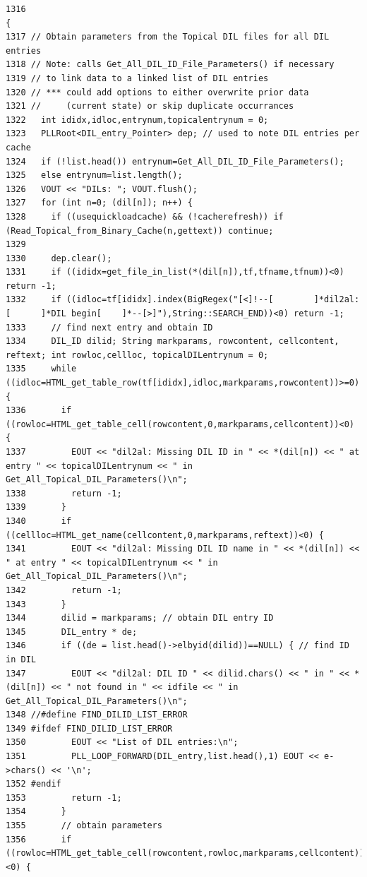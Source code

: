\footnotesize\begin{verbatim}1316                                                                                                        {
1317 // Obtain parameters from the Topical DIL files for all DIL entries
1318 // Note: calls Get_All_DIL_ID_File_Parameters() if necessary
1319 // to link data to a linked list of DIL entries
1320 // *** could add options to either overwrite prior data
1321 //     (current state) or skip duplicate occurrances
1322   int ididx,idloc,entrynum,topicalentrynum = 0;
1323   PLLRoot<DIL_entry_Pointer> dep; // used to note DIL entries per cache
1324   if (!list.head()) entrynum=Get_All_DIL_ID_File_Parameters();
1325   else entrynum=list.length();
1326   VOUT << "DILs: "; VOUT.flush();
1327   for (int n=0; (dil[n]); n++) {
1328     if ((usequickloadcache) && (!cacherefresh)) if (Read_Topical_from_Binary_Cache(n,gettext)) continue;
1329 
1330     dep.clear();
1331     if ((ididx=get_file_in_list(*(dil[n]),tf,tfname,tfnum))<0) return -1;
1332     if ((idloc=tf[ididx].index(BigRegex("[<]!--[        ]*dil2al:[      ]*DIL begin[    ]*--[>]"),String::SEARCH_END))<0) return -1;
1333     // find next entry and obtain ID
1334     DIL_ID dilid; String markparams, rowcontent, cellcontent, reftext; int rowloc,cellloc, topicalDILentrynum = 0;
1335     while ((idloc=HTML_get_table_row(tf[ididx],idloc,markparams,rowcontent))>=0) {
1336       if ((rowloc=HTML_get_table_cell(rowcontent,0,markparams,cellcontent))<0) {
1337         EOUT << "dil2al: Missing DIL ID in " << *(dil[n]) << " at entry " << topicalDILentrynum << " in Get_All_Topical_DIL_Parameters()\n";
1338         return -1;
1339       }
1340       if ((cellloc=HTML_get_name(cellcontent,0,markparams,reftext))<0) {
1341         EOUT << "dil2al: Missing DIL ID name in " << *(dil[n]) << " at entry " << topicalDILentrynum << " in Get_All_Topical_DIL_Parameters()\n";
1342         return -1;
1343       }
1344       dilid = markparams; // obtain DIL entry ID
1345       DIL_entry * de;
1346       if ((de = list.head()->elbyid(dilid))==NULL) { // find ID in DIL
1347         EOUT << "dil2al: DIL ID " << dilid.chars() << " in " << *(dil[n]) << " not found in " << idfile << " in Get_All_Topical_DIL_Parameters()\n";
1348 //#define FIND_DILID_LIST_ERROR
1349 #ifdef FIND_DILID_LIST_ERROR
1350         EOUT << "List of DIL entries:\n";
1351         PLL_LOOP_FORWARD(DIL_entry,list.head(),1) EOUT << e->chars() << '\n';
1352 #endif
1353         return -1;
1354       }
1355       // obtain parameters
1356       if ((rowloc=HTML_get_table_cell(rowcontent,rowloc,markparams,cellcontent))<0) {

\end{verbatim}
